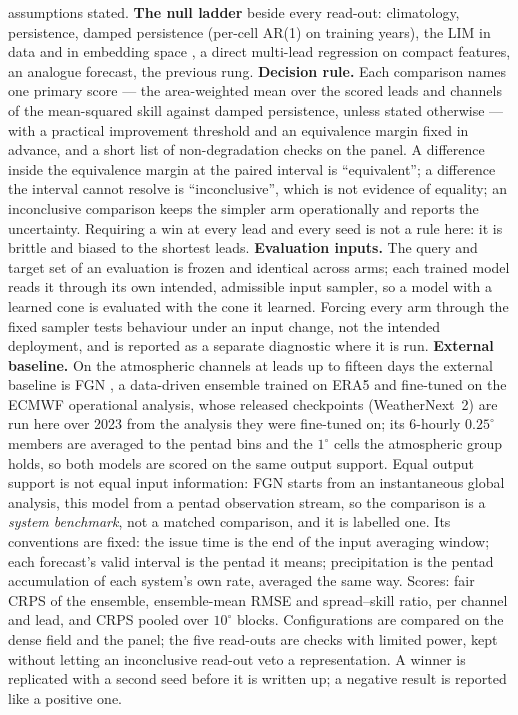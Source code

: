 \documentclass[10pt]{article}
\begin{document}
assumptions stated. \textbf{The null ladder} beside every read-out:
climatology, persistence, damped persistence (per-cell AR(1) on training
years), the LIM in data and in embedding space \cite{penland,newman}, a
direct multi-lead regression on compact features, an analogue forecast, the
previous rung. \textbf{Decision rule.} Each comparison names one primary
score --- the area-weighted mean over the scored leads and channels of the
mean-squared skill against damped persistence, unless stated otherwise ---
with a practical improvement threshold and an equivalence margin fixed in
advance, and a short list of non-degradation checks on the panel. A
difference inside the equivalence margin at the paired interval is
``equivalent''; a difference the interval cannot resolve is
``inconclusive'', which is not evidence of equality; an inconclusive
comparison keeps the simpler arm operationally and reports the uncertainty.
Requiring a win at every lead and every seed is not a rule here: it is
brittle and biased to the shortest leads. \textbf{Evaluation inputs.} The
query and target set of an evaluation is frozen and identical across arms;
each trained model reads it through its own intended, admissible input
sampler, so a model with a learned cone is evaluated with the cone it
learned. Forcing every arm through the fixed sampler tests behaviour under
an input change, not the intended deployment, and is reported as a separate
diagnostic where it is run. \textbf{External baseline.} On the atmospheric
channels at leads up to fifteen days the external baseline is FGN
\cite{fgn}, a data-driven ensemble trained on ERA5 and fine-tuned on the
ECMWF operational analysis, whose released checkpoints (WeatherNext~2) are
run here over 2023 from the analysis they were fine-tuned on; its 6-hourly
$0.25^\circ$ members are averaged to the pentad bins and the $1^\circ$ cells
the atmospheric group holds, so both models are scored on the same output
support. Equal output support is not equal input information: FGN starts
from an instantaneous global analysis, this model from a pentad observation
stream, so the comparison is a \emph{system benchmark}, not a matched
comparison, and it is labelled one. Its conventions are fixed: the issue
time is the end of the input averaging window; each forecast's valid
interval is the pentad it means; precipitation is the pentad accumulation
of each system's own rate, averaged the same way. Scores: fair CRPS of the
ensemble, ensemble-mean RMSE and spread--skill ratio, per channel and lead,
and CRPS pooled over $10^\circ$ blocks. Configurations are compared on the
dense field and the panel; the five read-outs are checks with limited power,
kept without letting an inconclusive read-out veto a representation. A
winner is replicated with a second seed before it is written up; a negative
result is reported like a positive one.
\end{document}
